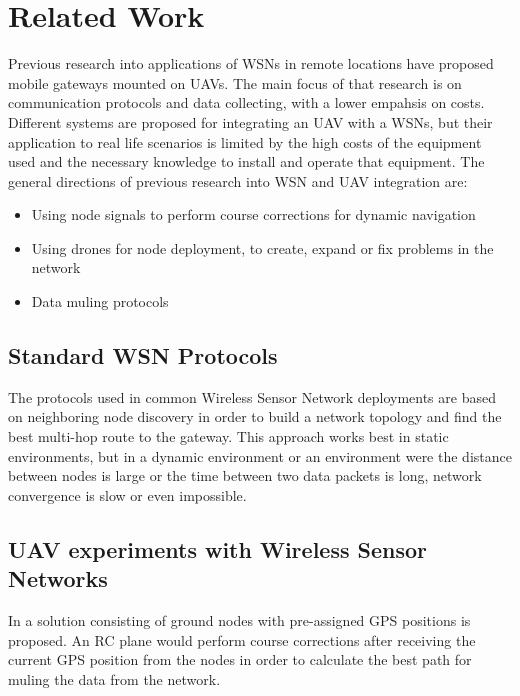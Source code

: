 \normalfont\normalsize
\chapter{Related Work}
\label{chap:related}

Previous research into applications of WSNs in remote locations have proposed mobile gateways mounted on UAVs. The main focus of that research is on communication protocols and data collecting, with a lower empahsis on costs. Different systems are proposed for integrating an UAV with a WSNs, but their application to real life scenarios is limited by the high costs of the equipment used and the necessary knowledge to install and operate that equipment.
The general directions of previous research into WSN and UAV integration are:
\begin{itemize}

\item Using node signals to perform course corrections for dynamic navigation \cite{savarese2001location}
\item Using drones for node deployment, to create, expand or fix problems in the network \cite{akyildiz2002wireless}
\item Data muling protocols

\end{itemize}

\section{Standard WSN Protocols}

The protocols used in common Wireless Sensor Network deployments are based on neighboring node discovery in order to build a network topology and find the best multi-hop route to the gateway. This approach works best in static environments, but in a dynamic environment or an environment were the distance between nodes is large or the time between two data packets is long, network convergence is slow or even impossible.

\section{UAV experiments with Wireless Sensor Networks}

In \cite{teh2008experiments} a solution consisting of ground nodes with pre-assigned GPS positions is proposed. An RC plane would perform course corrections after receiving the current GPS position from the nodes in order to calculate the best path for muling the data from the network.

